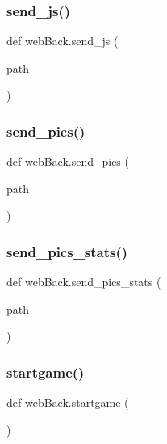 \hypertarget{namespaceweb_back_a36644ac58627cbb02b55457d97a7f915}{}\label{namespaceweb_back_a36644ac58627cbb02b55457d97a7f915} 
\subsubsection{\texorpdfstring{send\+\_\+js()}{send\_js()}}
{\footnotesize\ttfamily def web\+Back.\+send\+\_\+js (\begin{DoxyParamCaption}\item[{}]{path }\end{DoxyParamCaption})}

\hypertarget{namespaceweb_back_a8d2fb2f4dc56c083de514b9c0d43d7fb}{}\label{namespaceweb_back_a8d2fb2f4dc56c083de514b9c0d43d7fb} 
\subsubsection{\texorpdfstring{send\+\_\+pics()}{send\_pics()}}
{\footnotesize\ttfamily def web\+Back.\+send\+\_\+pics (\begin{DoxyParamCaption}\item[{}]{path }\end{DoxyParamCaption})}

\hypertarget{namespaceweb_back_a48f3c269d1d9ba6b7edf365414bbaea8}{}\label{namespaceweb_back_a48f3c269d1d9ba6b7edf365414bbaea8} 
\subsubsection{\texorpdfstring{send\+\_\+pics\+\_\+stats()}{send\_pics\_stats()}}
{\footnotesize\ttfamily def web\+Back.\+send\+\_\+pics\+\_\+stats (\begin{DoxyParamCaption}\item[{}]{path }\end{DoxyParamCaption})}

\hypertarget{namespaceweb_back_a5f030b0ffd219cb8152121a951e8767a}{}\label{namespaceweb_back_a5f030b0ffd219cb8152121a951e8767a} 
\subsubsection{\texorpdfstring{startgame()}{startgame()}}
{\footnotesize\ttfamily def web\+Back.\+startgame (\begin{DoxyParamCaption}{ }\end{DoxyParamCaption})}

